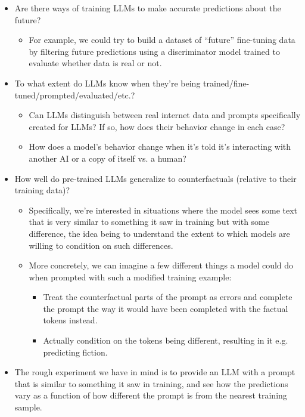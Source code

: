 {{\begin{itemize}
\begin{itemize}
    \item Are there ways of training LLMs to make accurate predictions about the future?
        \begin{itemize}
        \item For example, we could try to build a dataset of ``future'' fine-tuning data by filtering future predictions using a discriminator model trained to evaluate whether data is real or not.
        \end{itemize}
\end{itemize}
    \end{itemize}
\begin{itemize}
\item To what extent do LLMs know when they're being trained/fine-tuned/prompted/evaluated/etc.?
    \begin{itemize}
    \item Can LLMs distinguish between real internet data and prompts specifically created for LLMs? If so, how does their behavior change in each case?
    \item How does a model's behavior change when it's told it's interacting with another AI or a copy of itself vs. a human?
    \end{itemize}
\item How well do pre-trained LLMs generalize to counterfactuals (relative to their training data)?
    \begin{itemize}
    \item Specifically, we're interested in situations where the model sees some text that is very similar to something it saw in training but with some difference, the idea being to understand the extent to which models are willing to condition on such differences.
    \item More concretely, we can imagine a few different things a model could do when prompted with such a modified training example:
        \begin{itemize}
        \item Treat the counterfactual parts of the prompt as errors and complete the prompt the way it would have been completed with the factual tokens instead.
        \item Actually condition on the tokens being different, resulting in it e.g. predicting fiction.
        \end{itemize}
\end{itemize}
    \item The rough experiment we have in mind is to provide an LLM with a prompt that is similar to something it saw in training, and see how the predictions vary as a function of how different the prompt is from the nearest training sample.

\end{itemize}}}
